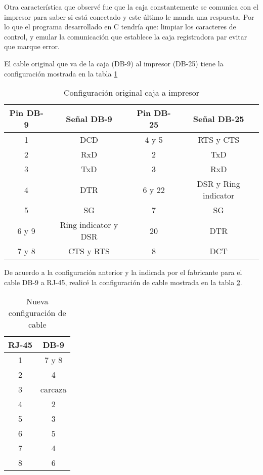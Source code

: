 Otra característica que observé fue que la caja constantemente se comunica con el impresor para saber si está conectado y este último le manda una respuesta. Por lo que el programa desarrollado en C tendría que: limpiar los caracteres de control, y emular la comunicación que establece la caja registradora par evitar que marque error.

El cable original que va de la caja (DB-9) al impresor (DB-25) tiene la configuración mostrada en la tabla \ref{tab:originaldigi}

\begin{table}[h]

\begin{center}
  \begin{tabular}{|c|c|c|c|}
   \hline
   Pin DB-9 & Señal DB-9 & Pin DB-25 & Señal DB-25 \\
   \hline
   1 &  DCD & 4 y 5 & RTS y CTS \\
   \hline
   2 & RxD & 2 & TxD \\
   \hline
   3 & TxD & 3 & RxD \\
   \hline
   4 & DTR & 6 y 22 & DSR y Ring indicator \\
   \hline
   5 & SG & 7 & SG \\
   \hline
   6 y 9 & Ring indicator y DSR & 20 & DTR \\
   \hline
   7 y 8 & CTS y RTS & 8 & DCT \\
   \hline
  \end{tabular}
  \caption{Configuración original caja a impresor}
  \label{tab:originaldigi}
\end{center}
\end{table}

De acuerdo a la configuración anterior y la indicada por el fabricante para el cable DB-9 a RJ-45, realicé la configuración de cable mostrada en la tabla \ref{tab:nuevaconf}.

\begin{table}[h]
\begin{center}
 \begin{tabular}{|c|c|}
  \hline
  RJ-45 & DB-9 \\
  \hline
  1 & 7 y 8 \\
  \hline
  2 & 4 \\
  \hline
  3 & carcaza \\
  \hline
  4 & 2 \\
  \hline
  5 & 3 \\
  \hline
  6 & 5 \\
  \hline
  7 & 4 \\
  \hline
  8 & 6 \\
  \hline
 \end{tabular}
 \caption{Nueva configuración de cable}
 \label{tab:nuevaconf}
\end{center}
\end{table}

